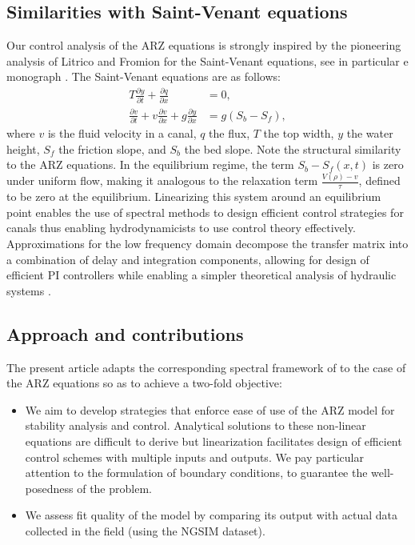 \documentclass[preprint]{elsarticle}
\begin{document}
\subsection{Similarities with Saint-Venant equations}
Our control analysis of the ARZ equations is strongly
inspired by the pioneering analysis of Litrico and Fromion for the Saint-Venant equations, see in particular e monograph \cite{litrico2009modeling}. The Saint-Venant equations are as follows:
\begin{align}
T\frac{\partial y}{\partial t}+\frac{\partial q}{\partial x}&=0, \\
\frac{\partial v}{\partial t}+v\frac{\partial v}{\partial x}+g\frac{\partial y}{\partial x}&=g\left(S_{b}-S_{f}\right),
\end{align}
where $v$ is the fluid velocity in a canal, $q$ the flux, $T$ the top width, $y$ the water height, $S_f$ the friction slope, and $S_b$ the bed slope. Note the structural similarity to the ARZ equations. In the equilibrium regime, the term $S_{b}-S_{f}\left(x,t\right)$ is zero under uniform flow, making it analogous to the relaxation term $\frac{V(\rho)-v}{\tau}$, defined to be zero at the equilibrium. Linearizing this system around an equilibrium point enables the use of spectral methods to design efficient control strategies for canals \cite{Litricoapplic} thus enabling hydrodynamicists to use control theory effectively. Approximations for the low frequency domain decompose the transfer matrix into a combination of delay and integration components, allowing for design of efficient PI controllers while enabling a simpler theoretical analysis of hydraulic systems \cite{litrico2009modeling, Litricoapplic}.

\subsection{Approach and contributions}
The present article adapts the corresponding spectral framework of \cite{litrico2009modeling} to the case of the ARZ equations so as to achieve a two-fold objective:

\begin{itemize}
\item We aim to develop strategies that enforce ease of use of the ARZ model for stability analysis and control. Analytical solutions to these non-linear equations are difficult to derive but linearization facilitates design of efficient control schemes with multiple inputs and outputs. We pay particular attention to the formulation of boundary conditions, to guarantee the well-posedness of the problem.
\item We assess fit quality of the model by comparing its output with actual data collected in the field (using the NGSIM dataset). 
\end{itemize}
\end{document}
